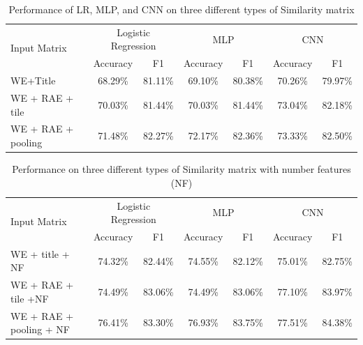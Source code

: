 \documentclass[conference]{IEEEtran}
\begin{document}
\begin{table}[!t]
	\center
	\caption{Performance of LR, MLP, and CNN on three different types of Similarity matrix}
	\begin{tabular}{|l|c|c|c|c|c|c|}
		\hline
		\multirow{2}{*}{Input Matrix} & \multicolumn{2}{c|}{Logistic Regression} & \multicolumn{2}{c|}{MLP} & \multicolumn{2}{c|}{CNN} \\
		\cline{2-7}
		& Accuracy & F1      & Accuracy & F1      & Accuracy & F1      \\ \hline
		WE+Title           & 68.29\%  & 81.11\% & 69.10\%  & 80.38\% & 70.26\%  & 79.97\% \\ \hline
		WE + RAE + tile    & 70.03\%  & 81.44\% & 70.03\%  & 81.44\% & 73.04\%  & 82.18\% \\ \hline
		WE + RAE + pooling & 71.48\%  & 82.27\%	& 72.17\%  & 82.36\% & 73.33\%  & 82.50\% \\ \hline
	\end{tabular}
	\label{tb1}
\end{table}

\begin{table}[!t]
	\center
	\caption{Performance on three different types of Similarity matrix with number features (NF)}
	\begin{tabular}{|l|c|c|c|c|c|c|}
		\hline
		\multirow{2}{*}{Input Matrix} & \multicolumn{2}{c|}{Logistic Regression} & \multicolumn{2}{c|}{MLP}& \multicolumn{2}{c|}{CNN} \\
		\cline{2-7}
		& Accuracy & F1      & Accuracy & F1      & Accuracy & F1      \\ \hline
		WE + title + NF         & 74.32\%  & 82.44\% & 74.55\%  & 82.12\% & 75.01\%  & 82.75\% \\ \hline
		WE + RAE + tile +NF     & 74.49\%  & 83.06\% & 74.49\%  & 83.06\% & 77.10\%  & 83.97\% \\ \hline
		WE + RAE + pooling + NF & 76.41\%  & 83.30\% & 76.93\%  & 83.75\% & 77.51\%  & 84.38\% \\ \hline
	\end{tabular}
	\label{tb1}
\end{table}
\end{document}
